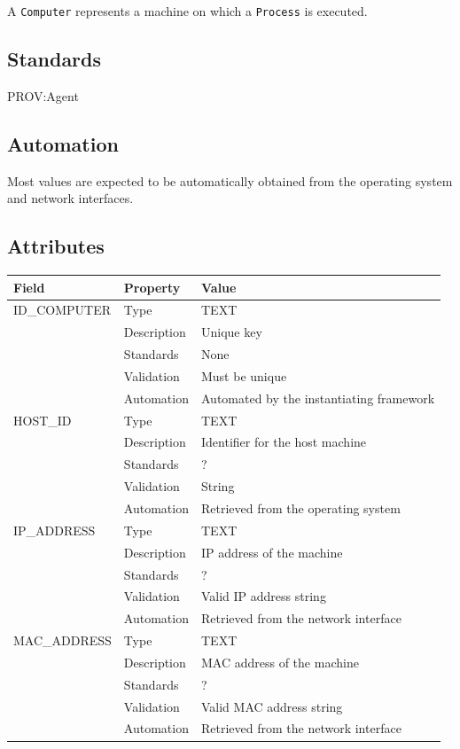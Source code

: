 \documentclass[
]{article}
\newcounter{none} %
\begin{document}
A \texttt{Computer} represents a machine on which a \texttt{Process} is
executed.

\subsection{Standards}\label{standards-8}

PROV:Agent

\subsection{Automation}\label{automation-8}

Most values are expected to be automatically obtained from the operating
system and network interfaces.

\subsection{Attributes}\label{attributes-8}

{\def\LTcaptype{none} %
\begin{longtable}[]{@{}lll@{}}
\toprule\noalign{}
Field & Property & Value \\
\midrule\noalign{}
\endhead
\bottomrule\noalign{}
\endlastfoot
ID\_COMPUTER & Type & TEXT \\
& Description & Unique key \\
& Standards & None \\
& Validation & Must be unique \\
& Automation & Automated by the instantiating framework \\
HOST\_ID & Type & TEXT \\
& Description & Identifier for the host machine \\
& Standards & ? \\
& Validation & String \\
& Automation & Retrieved from the operating system \\
IP\_ADDRESS & Type & TEXT \\
& Description & IP address of the machine \\
& Standards & ? \\
& Validation & Valid IP address string \\
& Automation & Retrieved from the network interface \\
MAC\_ADDRESS & Type & TEXT \\
& Description & MAC address of the machine \\
& Standards & ? \\
& Validation & Valid MAC address string \\
& Automation & Retrieved from the network interface \\
\end{longtable}
}
\end{document}
